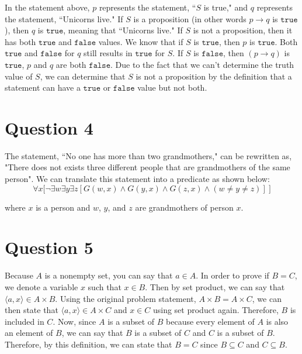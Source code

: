 \documentclass[letterpaper, 12pt]{article}
\begin{document}
In the statement above, $p$ represents the statement, ``$S$ is true," and $q$ represents the statement, ``Unicorns live." If $S$ is a proposition (in other words $p \to q$ is $\texttt{true}$), then $q$ is $\texttt{true}$, meaning that ``Unicorns live." If $S$ is not a proposition, then it has both $\texttt{true}$ and $\texttt{false}$ values. We know that if $S$ is $\texttt{true}$, then $p$ is $\texttt{true}$. Both $\texttt{true}$ and $\texttt{false}$ for $q$ still results in $\texttt{true}$ for $S$. If $S$ is $\texttt{false}$, then $(p \to q)$ is $\texttt{true}$, $p$ and $q$ are both $\texttt{false}$. Due to the fact that we can't determine the truth value of $S$, we can determine that $S$ is not a proposition by the definition that a statement can have a $\texttt{true}$ or $\texttt{false}$ value but not both.

\section*{Question 4}
The statement, ``No one has more than two grandmothers," can be rewritten as, "There does not exists three different people that are grandmothers of the same person". We can translate this statement into a predicate as shown below:
\[
\forall x \Bigg[ \neg \exists w \exists y \exists z [ G(w,x) \land G(y,x) \land G(z,x) \land (w \neq y \neq z)] \> \Bigg]
\]

where $x$ is a person and $w$, $y$, and $z$ are grandmothers of person $x$.

\section*{Question 5}
Because $A$ is a nonempty set, you can say that $a \in A$. In order to prove if $B = C$, we denote a variable $x$ such that $x \in B$. Then by set product, we can say that $\langle a,x \rangle \in A \times B$. Using the original problem statement, $A \times B = A \times C$, we can then state that $\langle a,x \rangle \in A \times C$ and $x \in C$ using set product again. Therefore, $B$ is included in $C$. Now, since $A$ is a subset of $B$ because every element of $A$ is also an element of $B$, we can say that $B$ is a subset of $C$ and $C$ is a subset of $B$. Therefore, by this definition, we can state that $B = C$ since $B \subseteq C$ and $C \subseteq B$.
\end{document}
